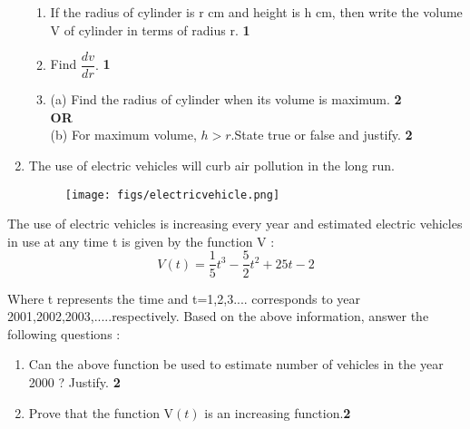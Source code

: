 \documentclass{article}
\providecommand{\brak}[1]{\ensuremath{\left(#1\right)}}
\begin{document}
\begin{enumerate}
 \begin{enumerate}[label=(\roman*)]

     \item  If the radius of cylinder is r cm and height is h cm, then write the volume V of cylinder in terms of radius r. \hfill \textbf{1}\\
     \item Find $\dfrac{dv}{dr}.$ \hfill \textbf{1}
     \item (a) Find the radius of cylinder when its volume is maximum. \hfill \textbf{2} \\
     \centering \textbf{OR} \\
     (b) For maximum volume, $h > r$.State true or false and justify. \hfill \textbf{2}
 
 \end{enumerate}
    
 \item The use of electric vehicles will curb air pollution in the long run.
 
\begin{figure}[!ht]
\centering
\texttt{[image: figs/electricvehicle.png]}
\end{figure}
\end{enumerate}
  
 The use of electric vehicles is increasing every year and estimated electric vehicles in use at any time t is given by the function V :
 \\
 \begin{equation}
     V(t)=\frac{1}{5}t^3 - \frac{5}{2}t^2 + 25t-2
 \end{equation}


 Where t represents the time and t=1,2,3.... corresponds to year 2001,2002,2003,.....respectively.\newline
 Based on the above information, answer the following questions :
 \begin{enumerate}[label=(\roman*)]
     \item Can the above function be used to estimate number of vehicles in the year 2000 ? Justify. \hfill \textbf{2}
     \item Prove that the function V\brak{t} is an increasing function.\hfill \textbf{2} 
 \end{enumerate}
 
 
   
  
  
\end{document}
